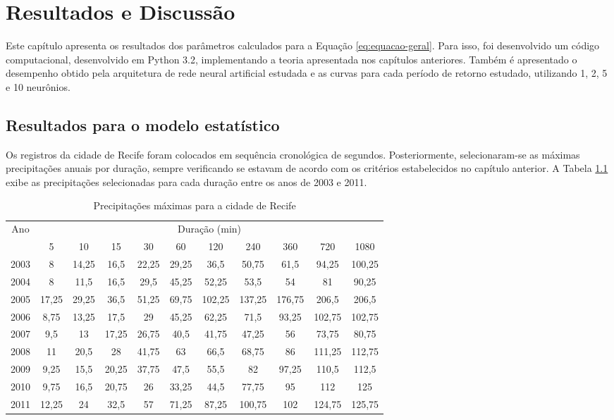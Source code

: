 \chapter{Resultados e Discussão}

Este capítulo apresenta os resultados dos parâmetros calculados para a Equação \ref{eq:equacao-geral}. Para isso, foi desenvolvido um código computacional, desenvolvido em Python 3.2, implementando a teoria apresentada nos capítulos anteriores. Também é apresentado o desempenho obtido pela arquitetura de rede neural artificial estudada e as curvas para cada período de retorno estudado, utilizando 1, 2, 5 e 10 neurônios.

\section{Resultados para o modelo estatístico}

Os registros da cidade de Recife foram colocados em sequência cronológica de segundos. Posteriormente, selecionaram-se as máximas precipitações anuais por duração, sempre verificando se estavam de acordo com os critérios estabelecidos no capítulo anterior. A Tabela \ref{tab:precipitacoes-recife} exibe as precipitações selecionadas para cada duração entre os anos de 2003 e 2011.

\begin{table}[h]
\caption{Precipitações máximas para a cidade de Recife}
\begin{tabular}{ccccccccccc}
\toprule
\centering
Ano & \multicolumn{10}{c}{Duração (min)}                                                  \\ \cline{2-11} 
     & 5     & 10    & 15    & 30    & 60    & 120    & 240    & 360    & 720    & 1080   \\ \hline
2003 & 8     & 14,25 & 16,5  & 22,25 & 29,25 & 36,5   & 50,75  & 61,5   & 94,25  & 100,25 \\
2004 & 8     & 11,5  & 16,5  & 29,5  & 45,25 & 52,25  & 53,5   & 54     & 81     & 90,25  \\
2005 & 17,25 & 29,25 & 36,5  & 51,25 & 69,75 & 102,25 & 137,25 & 176,75 & 206,5  & 206,5  \\
2006 & 8,75  & 13,25 & 17,5  & 29    & 45,25 & 62,25  & 71,5   & 93,25  & 102,75 & 102,75 \\
2007 & 9,5   & 13    & 17,25 & 26,75 & 40,5  & 41,75  & 47,25  & 56     & 73,75  & 80,75  \\
2008 & 11    & 20,5  & 28    & 41,75 & 63    & 66,5   & 68,75  & 86     & 111,25 & 112,75 \\
2009 & 9,25  & 15,5  & 20,25 & 37,75 & 47,5  & 55,5   & 82     & 97,25  & 110,5  & 112,5  \\
2010 & 9,75  & 16,5  & 20,75 & 26    & 33,25 & 44,5   & 77,75  & 95     & 112    & 125    \\
2011 & 12,25 & 24    & 32,5  & 57    & 71,25 & 87,25  & 100,75 & 102    & 124,75 & 125,75 \\ \bottomrule
\end{tabular}
\label{tab:precipitacoes-recife}
\end{table}

